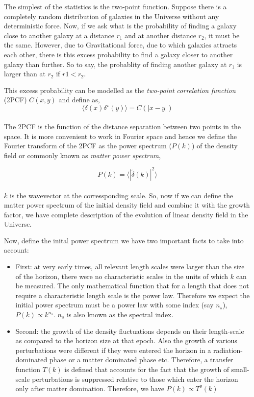 The simplest of the statistics is the two-point function. Suppose there is a 
completely random distribution of galaxies in the Universe without any deterministic 
force. Now, if we ask what is the probability of finding a galaxy close to another
galaxy at a distance $r_1$ and at another distance $r_2$, it must be the same. 
However, due to Gravitational force, due to which galaxies attracts each other, 
there is this excess probability to find a galaxy closer to another galaxy than
further. So to say, the probablity of finding another galaxy at $r_1$ is larger than
at $r_2$ if $r1<r_2$.

This excess probability can be modelled as the {\it two-point correlation function} (2PCF) 
$C(x,y)$ and define as, 
\begin{equation}
	\langle \delta(x) \delta^{\star}(y) \rangle = C(|x-y|)
\end{equation}
\\
The 2PCF is the function of the distance
separation between two points in the space. It is more convenient to work in 
Fourier space and hence we define the Fourier transform of the 2PCF as the 
power spectrum ($P(k)$) of the density field or commonly known as
{\it matter power spectrum},

\begin{equation}
		P(k)  =  \langle |\tilde{\delta}(k) |^2\rangle 
\end{equation}
\\
$k$ is the wavevector at the corressponding scale. So, now if we can 
define the matter power spectrum of the initial density field and combine
it with the growth factor, we have complete description of the evolution 
of linear density field in the Universe. 

Now, define the inital power spectrum we have two important facts to 
take into account:
\begin{itemize}
  \item	First: at very early times, all relevant length scales
	were larger than the size of the horizon, there were no characteristic scales
	in the units of which $k$ can be measured. The only mathematical function
	that for a length that does not require a characteristic length scale is
	the power law. Therefore we expect the initial power spectrum must be a power
	law with some index (say $n_s$), $P(k)\propto k^{n_s}$. $n_s$ is also known
	as the spectral index.
  \item Second: the growth of the density fluctuations depends on their length-scale
  	as compared to the horizon size at that epoch. Also the growth of various
  	perturbations were different if they were entered the horizon in a radiation-
  	dominated phase or a matter dominated phase etc. Therefore, a transfer function $T(k)$
  	is defined that accounts for the fact that the growth of small-scale perturbations
  	is suppressed relative to those which enter the horizon only after matter domination.
  	Therefore, we have $P(k) \propto T^2(k)$ 
\end{itemize}

